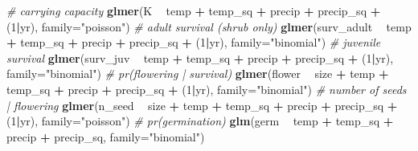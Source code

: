 \documentclass[]{article}
\newenvironment{Shaded}{\begin{snugshade}}{\end{snugshade}}
\newcommand{\CommentTok}[1]{\textcolor[rgb]{0.56,0.35,0.01}{\textit{#1}}}
\newcommand{\DataTypeTok}[1]{\textcolor[rgb]{0.13,0.29,0.53}{#1}}
\newcommand{\DecValTok}[1]{\textcolor[rgb]{0.00,0.00,0.81}{#1}}
\newcommand{\KeywordTok}[1]{\textcolor[rgb]{0.13,0.29,0.53}{\textbf{#1}}}
\newcommand{\NormalTok}[1]{#1}
\newcommand{\OperatorTok}[1]{\textcolor[rgb]{0.81,0.36,0.00}{\textbf{#1}}}
\newcommand{\StringTok}[1]{\textcolor[rgb]{0.31,0.60,0.02}{#1}}
\begin{document}
\begin{Shaded}
\begin{Highlighting}[]
\CommentTok{# carrying capacity}
\KeywordTok{glmer}\NormalTok{(K }\OperatorTok{~}\StringTok{ }\NormalTok{temp }\OperatorTok{+}\StringTok{ }\NormalTok{temp_sq }\OperatorTok{+}\StringTok{ }\NormalTok{precip }\OperatorTok{+}\StringTok{ }\NormalTok{precip_sq }\OperatorTok{+}\StringTok{ }\NormalTok{(}\DecValTok{1}\OperatorTok{|}\NormalTok{yr), }\DataTypeTok{family=}\StringTok{"poisson"}\NormalTok{)}
\CommentTok{# adult survival (shrub only)}
\KeywordTok{glmer}\NormalTok{(surv_adult }\OperatorTok{~}\StringTok{ }\NormalTok{temp }\OperatorTok{+}\StringTok{ }\NormalTok{temp_sq }\OperatorTok{+}\StringTok{ }\NormalTok{precip }\OperatorTok{+}\StringTok{ }\NormalTok{precip_sq }\OperatorTok{+}\StringTok{ }\NormalTok{(}\DecValTok{1}\OperatorTok{|}\NormalTok{yr), }\DataTypeTok{family=}\StringTok{"binomial"}\NormalTok{)}
\CommentTok{# juvenile survival}
\KeywordTok{glmer}\NormalTok{(surv_juv }\OperatorTok{~}\StringTok{ }\NormalTok{temp }\OperatorTok{+}\StringTok{ }\NormalTok{temp_sq }\OperatorTok{+}\StringTok{ }\NormalTok{precip }\OperatorTok{+}\StringTok{ }\NormalTok{precip_sq }\OperatorTok{+}\StringTok{ }\NormalTok{(}\DecValTok{1}\OperatorTok{|}\NormalTok{yr), }\DataTypeTok{family=}\StringTok{"binomial"}\NormalTok{)}
\CommentTok{# pr(flowering | survival)}
\KeywordTok{glmer}\NormalTok{(flower }\OperatorTok{~}\StringTok{ }\NormalTok{size }\OperatorTok{+}\StringTok{ }\NormalTok{temp }\OperatorTok{+}\StringTok{ }\NormalTok{temp_sq }\OperatorTok{+}\StringTok{ }\NormalTok{precip }\OperatorTok{+}\StringTok{ }\NormalTok{precip_sq }\OperatorTok{+}\StringTok{ }\NormalTok{(}\DecValTok{1}\OperatorTok{|}\NormalTok{yr), }\DataTypeTok{family=}\StringTok{"binomial"}\NormalTok{)}
\CommentTok{# number of seeds | flowering}
\KeywordTok{glmer}\NormalTok{(n_seed }\OperatorTok{~}\StringTok{ }\NormalTok{size }\OperatorTok{+}\StringTok{ }\NormalTok{temp }\OperatorTok{+}\StringTok{ }\NormalTok{temp_sq }\OperatorTok{+}\StringTok{ }\NormalTok{precip }\OperatorTok{+}\StringTok{ }\NormalTok{precip_sq }\OperatorTok{+}\StringTok{ }\NormalTok{(}\DecValTok{1}\OperatorTok{|}\NormalTok{yr), }\DataTypeTok{family=}\StringTok{"poisson"}\NormalTok{)}
\CommentTok{# pr(germination)}
\KeywordTok{glm}\NormalTok{(germ }\OperatorTok{~}\StringTok{ }\NormalTok{temp }\OperatorTok{+}\StringTok{ }\NormalTok{temp_sq }\OperatorTok{+}\StringTok{ }\NormalTok{precip }\OperatorTok{+}\StringTok{ }\NormalTok{precip_sq, }\DataTypeTok{family=}\StringTok{"binomial"}\NormalTok{)}
\end{Highlighting}
\end{Shaded}
\end{document}
